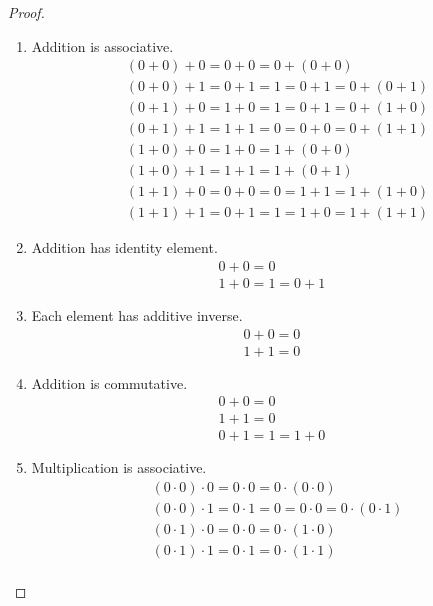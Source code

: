 \begin{proof}
	\begin{enumerate}[label = (\arabic*)]
		\item Addition is associative.
		      \[
			      \begin{split}
				      &(0 + 0) + 0 = 0 + 0 = 0 + (0 + 0) \\
				      &(0 + 0) + 1 = 0 + 1 = 1 = 0 + 1 = 0 + (0 + 1) \\
				      &(0 + 1) + 0 = 1 + 0 = 1 = 0 + 1 = 0 + (1 + 0) \\
				      &(0 + 1) + 1 = 1 + 1 = 0 = 0 + 0 = 0 + (1 + 1) \\
				      &(1 + 0) + 0 = 1 + 0 = 1 + (0 + 0) \\
				      &(1 + 0) + 1 = 1 + 1 = 1 + (0 + 1) \\
				      &(1 + 1) + 0 = 0 + 0 = 0 = 1 + 1 = 1 + (1 + 0) \\
				      &(1 + 1) + 1 = 0 + 1 = 1 = 1 + 0 = 1 + (1 + 1)
			      \end{split}
		      \]
		\item Addition has identity element.
		      \[
			      \begin{split}
				      0 + 0 = 0 \\
				      1 + 0 = 1 = 0 + 1
			      \end{split}
		      \]
		\item Each element has additive inverse.
		      \[
			      \begin{split}
				      0 + 0 = 0 \\
				      1 + 1 = 0
			      \end{split}
		      \]
		\item Addition is commutative.
		      \[
			      \begin{split}
				      0 + 0 = 0 \\
				      1 + 1 = 0 \\
				      0 + 1 = 1 = 1 + 0
			      \end{split}
		      \]
		\item Multiplication is associative.
		      \[
			      \begin{split}
				      &(0 \cdot 0) \cdot 0 = 0 \cdot 0 = 0 \cdot (0 \cdot 0) \\
				      &(0 \cdot 0) \cdot 1 = 0 \cdot 1 = 0 = 0 \cdot 0 = 0 \cdot (0 \cdot 1) \\
				      &(0 \cdot 1) \cdot 0 = 0 \cdot 0 = 0 \cdot (1 \cdot 0) \\
				      &(0 \cdot 1) \cdot 1 = 0 \cdot 1 = 0 \cdot (1 \cdot 1) \\

\end{split}\]
\end{enumerate}
\end{proof}
